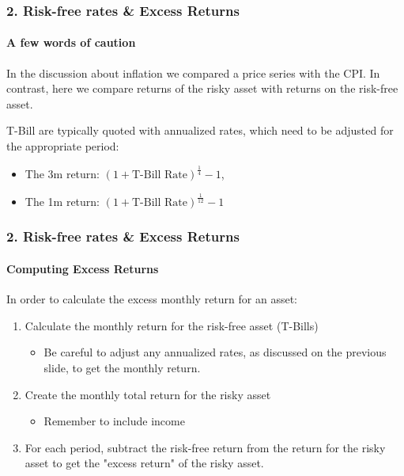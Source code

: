 \documentclass{beamer}
\begin{document}
\begin{frame}[t]
    \frametitle{2. Risk-free rates \& Excess Returns}
    \framesubtitle{A few words of caution}

    In the discussion about inflation we compared a price series with the CPI.  
    In contrast, here we compare returns of the risky asset with returns on the 
    risk-free asset.\\
    \vspace{1em}

    T-Bill are typically quoted with annualized rates, which need to be adjusted for the 
    appropriate period:
    \begin{itemize}
      \item The 3m return: $(1+\text{T-Bill Rate})^\frac{1}{4}-1$, 
      \item The 1m return: $(1+ \text{T-Bill Rate})^\frac{1}{12}-1$\\
    \end{itemize}


\end{frame}

\begin{frame}[t]
    \frametitle{2. Risk-free rates \& Excess Returns}
    \framesubtitle{Computing Excess Returns}

    In order to calculate the excess monthly return for an asset:
    \begin{enumerate}
      \item Calculate the monthly return for the risk-free asset (T-Bills)
      \begin{itemize}
        \item Be careful to adjust any annualized rates, as discussed on the previous slide, to get the monthly return.
      \end{itemize}
      \item Create the monthly total return for the risky asset 
        \begin{itemize}
        \item Remember to include income
      \end{itemize}
      \item For each period, subtract the risk-free return from the return for the risky asset to get the "excess return" of the risky asset.\\


    \end{enumerate}
    
\end{frame}
\end{document}
